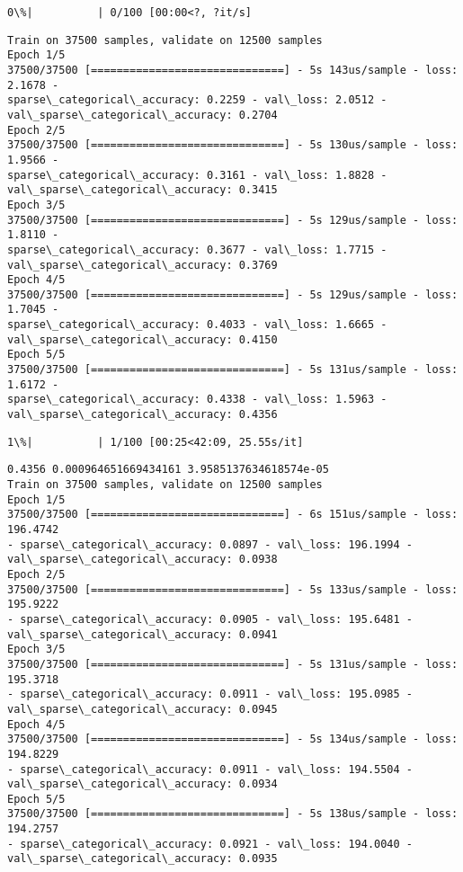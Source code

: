\documentclass[11pt]{article}
\begin{document}
    \begin{Verbatim}[commandchars=\\\{\}]
  0\%|          | 0/100 [00:00<?, ?it/s]
    \end{Verbatim}

    \begin{Verbatim}[commandchars=\\\{\}]
Train on 37500 samples, validate on 12500 samples
Epoch 1/5
37500/37500 [==============================] - 5s 143us/sample - loss: 2.1678 -
sparse\_categorical\_accuracy: 0.2259 - val\_loss: 2.0512 -
val\_sparse\_categorical\_accuracy: 0.2704
Epoch 2/5
37500/37500 [==============================] - 5s 130us/sample - loss: 1.9566 -
sparse\_categorical\_accuracy: 0.3161 - val\_loss: 1.8828 -
val\_sparse\_categorical\_accuracy: 0.3415
Epoch 3/5
37500/37500 [==============================] - 5s 129us/sample - loss: 1.8110 -
sparse\_categorical\_accuracy: 0.3677 - val\_loss: 1.7715 -
val\_sparse\_categorical\_accuracy: 0.3769
Epoch 4/5
37500/37500 [==============================] - 5s 129us/sample - loss: 1.7045 -
sparse\_categorical\_accuracy: 0.4033 - val\_loss: 1.6665 -
val\_sparse\_categorical\_accuracy: 0.4150
Epoch 5/5
37500/37500 [==============================] - 5s 131us/sample - loss: 1.6172 -
sparse\_categorical\_accuracy: 0.4338 - val\_loss: 1.5963 -
val\_sparse\_categorical\_accuracy: 0.4356
    \end{Verbatim}

    \begin{Verbatim}[commandchars=\\\{\}]
  1\%|          | 1/100 [00:25<42:09, 25.55s/it]
    \end{Verbatim}

    \begin{Verbatim}[commandchars=\\\{\}]
0.4356 0.000964651669434161 3.9585137634618574e-05
Train on 37500 samples, validate on 12500 samples
Epoch 1/5
37500/37500 [==============================] - 6s 151us/sample - loss: 196.4742
- sparse\_categorical\_accuracy: 0.0897 - val\_loss: 196.1994 -
val\_sparse\_categorical\_accuracy: 0.0938
Epoch 2/5
37500/37500 [==============================] - 5s 133us/sample - loss: 195.9222
- sparse\_categorical\_accuracy: 0.0905 - val\_loss: 195.6481 -
val\_sparse\_categorical\_accuracy: 0.0941
Epoch 3/5
37500/37500 [==============================] - 5s 131us/sample - loss: 195.3718
- sparse\_categorical\_accuracy: 0.0911 - val\_loss: 195.0985 -
val\_sparse\_categorical\_accuracy: 0.0945
Epoch 4/5
37500/37500 [==============================] - 5s 134us/sample - loss: 194.8229
- sparse\_categorical\_accuracy: 0.0911 - val\_loss: 194.5504 -
val\_sparse\_categorical\_accuracy: 0.0934
Epoch 5/5
37500/37500 [==============================] - 5s 138us/sample - loss: 194.2757
- sparse\_categorical\_accuracy: 0.0921 - val\_loss: 194.0040 -
val\_sparse\_categorical\_accuracy: 0.0935
    \end{Verbatim}
\end{document}
